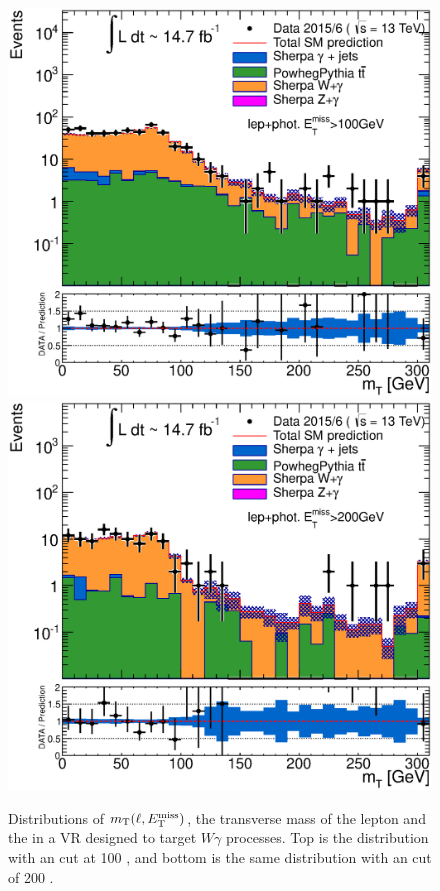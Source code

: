 \begin{centering}
\begin{figure}[!hbt]
\myfloatalign
\includegraphics[width=.9\linewidth]{figures/photons/hPhotLep_mT_MET100_hist.eps}
\includegraphics[width=.9\linewidth]{figures/photons/hPhotLep_mT_MET200_hist.eps}
\caption{Distributions of $m_{\text{T}}(\ell,E_{\text{T}}^{\text{miss}})$, the transverse mass of the lepton and the \met in a \ac{VR} designed to target $W\gamma$ processes. Top is the distribution with an \met cut at 100 \gev, and bottom is the same distribution with an \met cut of 200 \gev.}
\label{fig:photons_vgunc}
\end{figure}
\end{centering}

